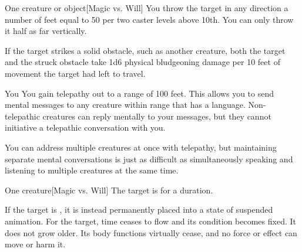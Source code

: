 \begin{spelltarget}{One creature or object}[Magic vs. Will]
    \spellsuccess You throw the target in any direction a number of feet equal to 50  per two caster levels above 10th. You can only throw it half as far vertically.

    If the target strikes a solid obstacle, such as another creature, both the target and the struck obstacle take 1d6 physical bludgeoning damage per 10 feet of movement the target had left to travel.
\end{spelltarget}

\spelldur{\durlong}
\begin{spelltarget}{You}
    \spelleffect You gain telepathy out to a range of 100 feet. This allows you to send mental messages to any creature within range that has a language. Non-telepathic creatures can reply mentally to your messages, but they cannot initiative a telepathic conversation with you.

    You can address multiple creatures at once with telepathy, but maintaining separate mental conversations is just as difficult as simultaneously speaking and listening to multiple creatures at the same time. 
\end{spelltarget}

\begin{spelltarget}{One creature}[Magic vs. Will]
    \spellsuccess The target is \slowed for a \durlong duration.

    If the target is \bloodied, it is instead permanently placed into a state of suspended animation. For the target, time ceases to flow and its condition becomes fixed. It does not grow older. Its body functions virtually cease, and no force or effect can move or harm it.
\end{spelltarget}

